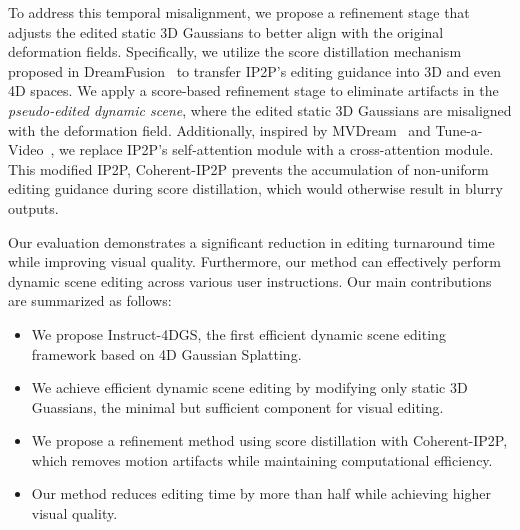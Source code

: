 To address this temporal misalignment, we propose a refinement stage that adjusts the edited static 3D Gaussians to better align with the original deformation fields. Specifically, we utilize the score distillation mechanism proposed in DreamFusion~\cite{ref_18_dreamfusion} to transfer IP2P's editing guidance into 3D and even 4D spaces. We apply a score-based refinement stage to eliminate artifacts in the \textit{pseudo-edited dynamic scene}, where the edited static 3D Gaussians are misaligned with the deformation field. Additionally, inspired by MVDream~\cite{ref_20_mvdream} and Tune-a-Video~\cite{ref_21_tuneavideo}, we replace IP2P's self-attention module with a cross-attention module. This modified IP2P, Coherent-IP2P prevents the accumulation of non-uniform editing guidance during score distillation, which would otherwise result in blurry outputs.

Our evaluation demonstrates a significant reduction in editing turnaround time while improving visual quality. Furthermore, our method can effectively perform dynamic scene editing across various user instructions. Our main contributions are summarized as follows:
    \begin{itemize}
        \vspace{1mm}
        \item
        We propose Instruct-4DGS, the first efficient dynamic scene editing framework based on 4D Gaussian Splatting.
        \item
        \vspace{0.5mm}
        We achieve efficient dynamic scene editing by modifying only static 3D Guassians, the minimal but sufficient component for visual editing.
        \item
        \vspace{0.5mm}
        We propose a refinement method using score distillation with Coherent-IP2P, which removes motion artifacts while maintaining computational efficiency.
        \item
        \vspace{0.5mm}
        Our method reduces editing time by more than half while achieving higher visual quality.
        \vspace{0.5mm}
    \end{itemize}
\vspace{4mm}
